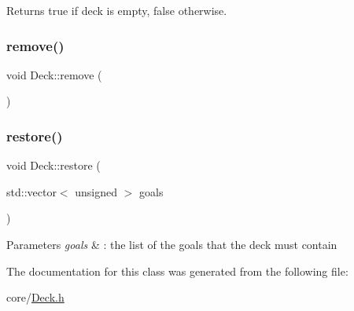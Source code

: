 \begin{DoxyReturn}{Returns}
true if deck is empty, false otherwise. 
\end{DoxyReturn}
\mbox{\label{classDeck_afe89a25e4f68a07c9b83b9223fc0e58b}} 
\subsubsection{\texorpdfstring{remove()}{remove()}}
{\footnotesize\ttfamily void Deck\+::remove (\begin{DoxyParamCaption}{ }\end{DoxyParamCaption})}

\mbox{\label{classDeck_abeb7668dc06b3f8118bf507234fb8ff4}} 
\subsubsection{\texorpdfstring{restore()}{restore()}}
{\footnotesize\ttfamily void Deck\+::restore (\begin{DoxyParamCaption}\item[{std\+::vector$<$ unsigned $>$}]{goals }\end{DoxyParamCaption})}


\begin{DoxyParams}{Parameters}
{\em goals} & \+: the list of the goals that the deck must contain \\
\hline
\end{DoxyParams}


The documentation for this class was generated from the following file\+:\begin{DoxyCompactItemize}
\item 
core/\mbox{\hyperlink{Deck_8h}{Deck.\+h}}\end{DoxyCompactItemize}
